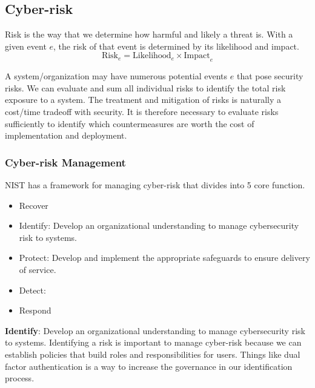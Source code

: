 \documentclass[11pt]{article}
\begin{document}
\subsection{Cyber-risk}
Risk is the way that we determine how harmful and likely a threat is.
With a given event $e$, the risk of that event is determined by its likelihood and impact.
\begin{equation}
    \text{Risk}_e = \text{Likelihood}_e \times \text{Impact}_e
\end{equation}

A system/organization may have numerous potential events $e$ that pose security risks.
We can evaluate and sum all individual risks to identify the total risk exposure to a system.
The treatment and mitigation of risks is naturally a cost/time tradeoff with security.
It is therefore necessary to evaluate risks sufficiently to identify which countermeasures are worth the cost of implementation and deployment.

\subsubsection{Cyber-risk Management}
NIST has a framework for managing cyber-risk that divides into 5 core function.
\begin{itemize}
    \item Recover
    \item Identify: Develop an organizational understanding to manage cybersecurity risk to systems.
    \item Protect: Develop and implement the appropriate safeguards to ensure delivery of service.
    \item Detect: 
    \item Respond
\end{itemize}

\textbf{Identify}: Develop an organizational understanding to manage cybersecurity risk to systems.
Identifying a risk is important to manage cyber-risk because we can establish policies that build roles and responsibilities for users.
Things like dual factor authentication is a way to increase the governance in our identification process.
\end{document}
